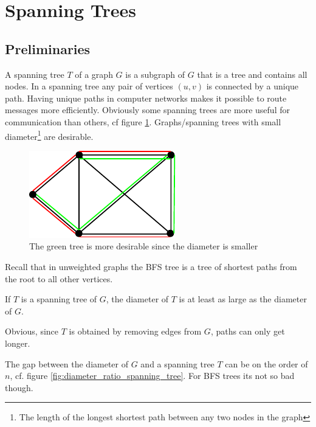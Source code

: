 \section{Spanning Trees}
\subsection{Preliminaries}

A spanning tree $T$ of a graph $G$ is a subgraph of $G$ that is a tree and contains all nodes. In a spanning tree any pair of vertices $(u,v)$ is connected by a unique path. Having unique paths in computer networks makes it possible to route messages more efficiently. Obviously some spanning trees are more useful for communication than others, cf figure \ref{fig:not_all_trees_equal}. Graphs/spanning trees with small diameter\footnote{The length of the longest shortest path between any two nodes in the graph} are desirable.

\begin{figure}[hbt]
\begin{center}
\includegraphics[scale=1.5]{./images/not_all_trees_equal}
\end{center}
\caption{The green tree is more desirable since the diameter is smaller}
\label{fig:not_all_trees_equal}
\end{figure}

Recall that in unweighted graphs the BFS tree is a tree of shortest paths from the root to all other vertices.

\begin{lem} If $T$ is a spanning tree of $G$, the diameter of $T$ is at least as large as the diameter of $G$.\end{lem}

\begin{pr} Obvious, since $T$ is obtained by removing edges from $G$, paths can only get longer.\end{pr}

The gap between the diameter of $G$ and a spanning tree $T$ can be on the order of $n$, cf. figure \ref{fig:diameter_ratio_spanning_tree}. For BFS trees its not so bad though.

